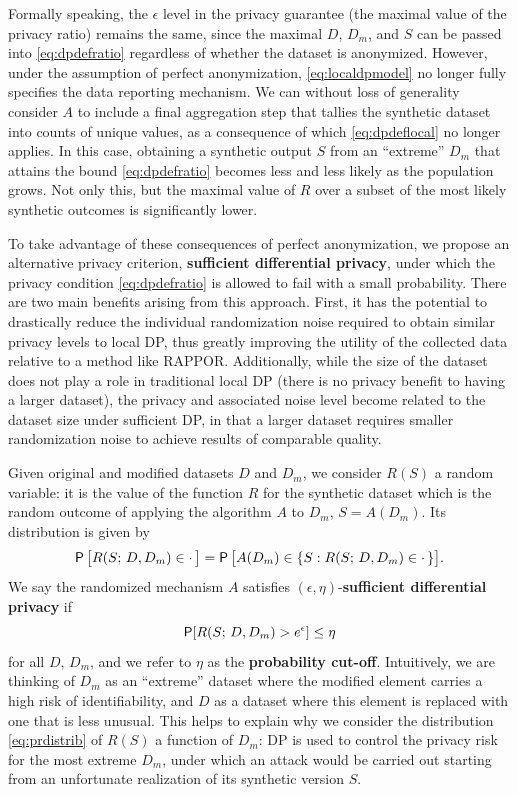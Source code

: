 \documentclass[11pt]{article}
\begin{document}
Formally speaking, the $\epsilon$ level in the privacy guarantee (the maximal value of the privacy ratio) remains the same, since the maximal $D$, $D_m$, and $S$ can be passed into \eqref{eq:dpdefratio} regardless of whether the dataset is anonymized.
However, under the assumption of perfect anonymization, \eqref{eq:localdpmodel} no longer fully specifies the data reporting mechanism. We can without loss of generality consider $A$ to include a final aggregation step that tallies the synthetic dataset into counts of unique values, as a consequence of which \eqref{eq:dpdeflocal} no longer applies.
In this case, obtaining a synthetic output $S$ from an ``extreme'' $D_m$ that attains the bound \eqref{eq:dpdefratio} becomes less and less likely as the population grows.
Not only this, but the maximal value of $R$ over a subset of the most likely synthetic outcomes is significantly lower.

To take advantage of these consequences of perfect anonymization, we propose an alternative privacy criterion, \textbf{sufficient differential privacy}, under which the privacy condition \eqref{eq:dpdefratio} is allowed to fail with a small probability.
There are two main benefits arising from this approach.
First, it has the potential to drastically reduce the individual randomization noise required to obtain similar privacy levels to local DP, thus greatly improving the utility of the collected data relative to a method like RAPPOR.
Additionally, while the size of the dataset does not play a role in traditional local DP (\ie there is no privacy benefit to having a larger dataset), the privacy and associated noise level become related to the dataset size under sufficient DP, in that a larger dataset requires smaller randomization noise to achieve results of comparable quality.

Given original and modified datasets $D$ and $D_m$, we consider $R(S)$ a random variable: it is the value of the function $R$ for the synthetic dataset which is the random outcome of applying the algorithm $A$ to $D_m$, \ie $S = A(D_m)$.
Its distribution is given by
\begin{equation} \label{eq:prdistrib}
\P\big[R(S;\, D, D_m) \in \cdot\,\big] = \P\big[A(D_m) \in \{S : R(S;\, D, D_m) \in \cdot\,\}\big].
\end{equation}
We say the randomized mechanism $A$ satisfies $(\epsilon, \eta)$-\textbf{sufficient differential privacy} if
\begin{equation}\label{eq:suffpr}
\P[R(S;\, D, D_m) > e^\epsilon] \leq \eta
\end{equation}
for all $D$, $D_m$, and we refer to $\eta$ as the \textbf{probability cut-off}.
Intuitively, we are thinking of $D_m$ as an ``extreme'' dataset where the modified element carries a high risk of identifiability, and $D$ as a dataset where this element is replaced with one that is less unusual.
This helps to explain why we consider the distribution \eqref{eq:prdistrib} of $R(S)$ a function of $D_m$: DP is used to control the privacy risk for the most extreme $D_m$, under which an attack would be carried out starting from an unfortunate realization of its synthetic version $S$.
\end{document}
